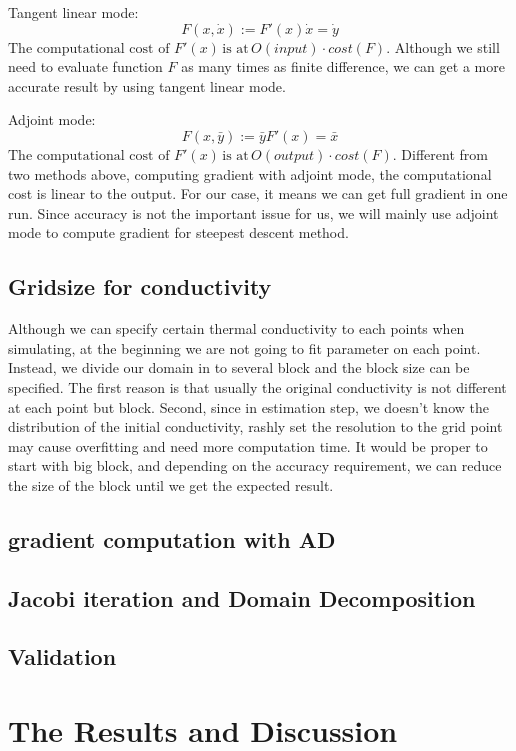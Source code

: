 \documentclass[10pt,a4paper]{report}
\begin{document}
Tangent linear mode:
\[F(x,\dot{x}):=F'(x)\dot{x}=\dot{y}\]
$\text{The computational cost of }F'(x)\, \text{is at} \, O(input) \cdot cost(F)$. Although we still need to evaluate function $F$ as many times as finite difference, we can get a more accurate result by using tangent linear mode.

Adjoint mode:
\[F(x,\bar{y}):=\bar{y}F'(x)=\bar{x}\]
$\text{The computational cost of }F'(x)\, \text{is at} \, O(output) \cdot cost(F)$. Different from two methods above, computing gradient with adjoint mode, the computational cost is linear to the output. For our case, it means we can get full gradient in one run. Since accuracy is not the important issue for us, we will mainly use adjoint mode to compute gradient for steepest descent method. 
     



\section{Gridsize for conductivity}
Although we can specify certain thermal conductivity to each points when simulating, at the beginning we are not going to fit parameter on each point. Instead, we divide our domain in to several block and the block size can be specified. The first reason is that usually the original conductivity is not different at each point but block. Second, since in estimation step, we doesn't know the distribution of the initial conductivity, rashly set the resolution to the grid point may cause overfitting and need more computation time. It would be proper to start with big block, and depending on the accuracy requirement, we can reduce the size of the block until we get the expected result.   


\section{gradient computation with AD}
\section{Jacobi iteration and Domain Decomposition}
\section{Validation }




\chapter{The Results and Discussion}
\end{document}
